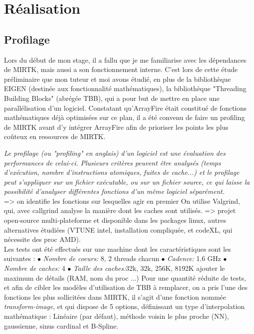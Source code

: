 \documentclass[10pt]{report}
\begin{document}
\chapter{Réalisation}
	\section{Profilage}
	Lors du début de mon stage, il a fallu que je me familiarise avec les dépendances de MIRTK, mais aussi a son fonctionnement interne. C'est lors de cette étude préliminaire que mon tuteur et moi avons étudié, en plus de la bibliothèque EIGEN (destinée aux fonctionnalité mathématiques), la bibliothèque "Threading Building Blocks" (abrégée TBB), qui a pour but de mettre en place une parallélisation d'un logiciel. Constatant qu'ArrayFire était constitué de fonctions mathématiques déjà optimisées sur ce plan, il a été convenu de faire un profiling de MIRTK avant d'y intégrer ArrayFire afin de prioriser les points les plus coûteux en ressources de MIRTK. 
	
	\textit{Le profilage (ou "profiling" en anglais) d'un logiciel est une évaluation des performances de celui-ci. Plusieurs critères peuvent être analysés (temps d'exécution, nombre d'instructions atomiques, fuites de cache...) et le profilage peut s'appliquer sur un fichier exécutable, ou sur un fichier source, ce qui laisse la possibilité d'analyser différentes fonctions d'un même logiciel séparément.}\\
	
	=> on identifie les fonctions sur lesquelles agir en premier
	On utilise Valgrind, qui, avec callgrind analyse la manière dont les caches sont utilisés.
 => projet open-source multi-plateforme et disponible dans les packages linux, autres alternatives étudiées (VTUNE intel, installation compliquée, et codeXL, qui nécessite des proc AMD).\\
	
	
	Les tests ont été effectués sur une machine dont les caractéristiques sont les suivantes : \newline
	{$\bullet$} \textit{Nombre de coeurs:} 8, 2 threads chacun\newline
	{$\bullet$} \textit{Cadence:} 1.6 GHz \newline
	{$\bullet$} \textit{Nombre de caches:} 4 \newline
	{$\bullet$} \textit{Taille des caches:}32k, 32k, 256K, 8192K \newline
	ajouter le maximum de détails (RAM, nom du proc ...)\newline
	Pour une quantité réduite de tests, et afin de cibler les modèles d'utilisation de TBB à remplacer, on a pris l'une des fonctions les plus sollicitées dans MIRTK, il s'agit d'une fonction nommée \textit{transform-image}, et qui dispose de 5 options, définissant un type d'interpolation mathématique : Linéaire (par défaut), méthode voisin le plus proche (NN), gaussienne, sinus cardinal et B-Spline. 
	
\end{document}
